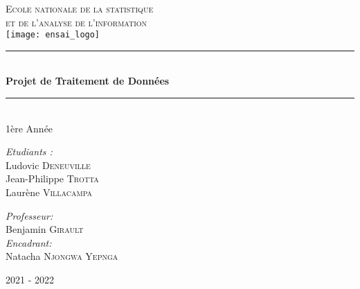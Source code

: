 \documentclass[11pt]{article}
\newcommand{\HRule}{\rule{\linewidth}{0.5mm}}
\begin{document}
\begin{titlepage}

\begin{center}


\textsc{{\LARGE Ecole nationale de la statistique \\et de l'analyse de l'information}} \\ %
\vspace{5mm}
\texttt{[image: ensai\_logo]}\\[2 cm] %



\HRule \\[0.4cm]
{ \huge \bfseries Projet de Traitement de Données}\\[0.4cm]

\HRule \\[1cm]

{\Large 1ère Année}\\ [2cm]


\begin{flushleft} \Large
\emph{Etudiants :}\\
Ludovic \textsc{Deneuville} \\
Jean-Philippe \textsc{Trotta} \\
Laurène \textsc{Villacampa} \\
\end{flushleft}

\begin{flushright} \Large
\emph{Professeur:} \\
Benjamin \textsc{Girault} \\
\emph{Encadrant:} \\
Natacha \textsc{Njongwa Yepnga} \\
\end{flushright}


\vfill
{\large 2021 - 2022}
\end{center}
\end{titlepage} 

\renewcommand{\contentsname}{Sommaire}
\tableofcontents
\newpage

\end{document}
